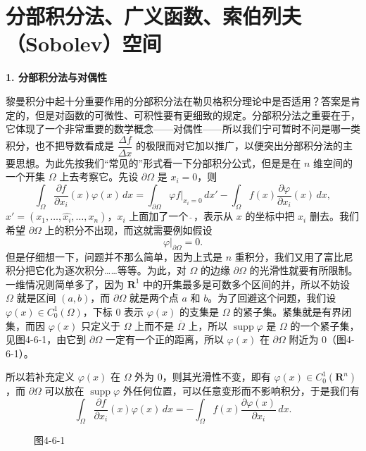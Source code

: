 \section{分部积分法、广义函数、索伯列夫（Sobolev）空间}

\noindent\textbf{1. 分部积分法与对偶性}

黎曼积分中起十分重要作用的分部积分法在勒贝格积分理论中是否适用？答案是肯定的，但是对函数的可微性、可积性要有更细致的规定。分部积分法之重要在于，它体现了一个非常重要的数学概念——对偶性——所以我们宁可暂时不问是哪一类积分，也不把导数看成是 $\dfrac{\Delta f}{\Delta x}$ 的极限而对它加以推广，以便突出分部积分法的主要思想。为此先按我们“常见的”形式看一下分部积分公式，但是是在 $n$ 维空间的一个开集 $\Omega$ 上去考察它。先设 $\partial\Omega$ 是 $x_i=0$，则
\[
 \int_\Omega\frac{\partial f}{\partial x_i}(x)\varphi(x)\,dx
 =\int_{\partial\Omega}\left.\varphi f\right|_{x_i=0}\,dx'
 -\int_\Omega f(x)\frac{\partial\varphi}{\partial x_i}(x)\,dx,
\]
$x'=(x_1,\ldots,\widehat{x_i},\ldots,x_n)$，$x_i$ 上面加了一个 $\widehat{\ }$，表示从 $x$ 的坐标中把 $x_i$ 删去。我们希望 $\partial\Omega$ 上的积分不出现，而这就需要例如假设
\[
 \varphi|_{\partial\Omega}=0.
\]
但是仔细想一下，问题并不那么简单，因为上式是 $n$ 重积分，我们又用了富比尼积分把它化为逐次积分……等等。为此，对 $\Omega$ 的边缘 $\partial\Omega$ 的光滑性就要有所限制。一维情况则简单多了，因为 $\mathbf R^1$ 中的开集最多是可数多个区间的并，所以不妨设 $\Omega$ 就是区间 $(a,b)$，而 $\partial\Omega$ 就是两个点 $a$ 和 $b$。为了回避这个问题，我们设 $\varphi(x)\in C_0^1(\Omega)$，下标 0 表示 $\varphi(x)$ 的支集是 $\Omega$ 的紧子集。紧集就是有界闭集，而因 $\varphi(x)$ 只定义于 $\Omega$ 上而不是 $\overline\Omega$ 上，所以 $\operatorname{supp}\varphi$ 是 $\Omega$ 的一个紧子集，见图4-6-1，由它到 $\partial\Omega$ 一定有一个正的距离，所以 $\varphi(x)$ 在 $\partial\Omega$ 附近为 0（图4-6-1）。

所以若补充定义 $\varphi(x)$ 在 $\Omega$ 外为 0，则其光滑性不变，即有 $\varphi(x)\in C_0^1(\mathbf R^n)$，而 $\partial\Omega$ 可以放在 $\operatorname{supp}\varphi$ 外任何位置，可以任意变形而不影响积分，于是我们有
\begin{equation}
 \int_\Omega\frac{\partial f}{\partial x_i}(x)\varphi(x)\,dx
 =-\int_\Omega f(x)\frac{\partial\varphi(x)}{\partial x_i}\,dx.
 \tag{1}
\end{equation}

\begin{figure}[htbp]
\centering
{}
\caption*{图4-6-1}
\end{figure}

